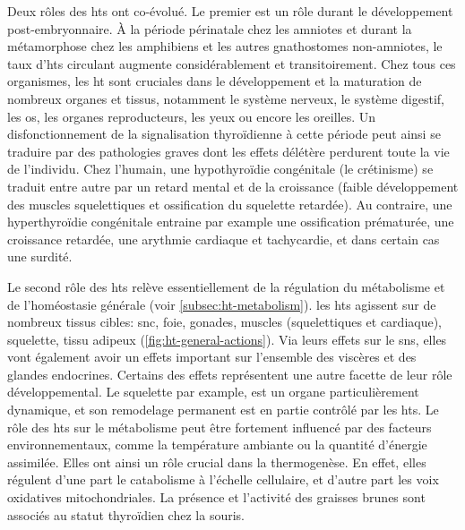 

Deux rôles des \glspl{ht} ont co-évolué.
Le premier est un rôle durant le développement post-embryonnaire.
À la période périnatale chez les amniotes et durant la métamorphose chez les amphibiens et les autres gnathostomes non-amniotes, le taux d'\glspl{ht} circulant augmente considérablement et transitoirement.
Chez tous ces organismes, les \gls{ht} sont cruciales dans le développement et la maturation de nombreux organes et tissus, notamment le système nerveux, le système digestif, les os, les organes reproducteurs, les yeux ou encore les oreilles.
Un disfonctionnement de la signalisation thyroïdienne à cette période peut ainsi se traduire par des pathologies graves dont les effets délétère perdurent toute la vie de l'individu.
Chez l'humain, une hypothyroïdie congénitale (le crétinisme) se traduit entre autre par un retard mental et de la croissance (faible développement des muscles squelettiques et ossification du squelette retardée).
Au contraire, une hyperthyroïdie congénitale entraine par example une ossification prématurée, une croissance retardée, une arythmie cardiaque et tachycardie, et dans certain cas une surdité.

Le second rôle des \glspl{ht} relève essentiellement de la régulation du métabolisme et de l'homéostasie générale (voir \autoref{subsec:ht-metabolism}).
les \glspl{ht} agissent sur de nombreux tissus cibles: \gls{snc}, foie, gonades, muscles (squelettiques et cardiaque), squelette, tissu adipeux (\autoref{fig:ht-general-actions}).
Via leurs effets sur le \gls{sns}, elles vont également avoir un effets important sur l'ensemble des viscères et des glandes endocrines.
Certains des effets représentent une autre facette de leur rôle développemental.
Le squelette par example, est un organe particulièrement dynamique, et son remodelage permanent est en partie contrôlé par les \glspl{ht}.
Le rôle des \glspl{ht} sur le métabolisme peut être fortement influencé par des facteurs environnementaux, comme la température ambiante ou la quantité d'énergie assimilée.
Elles ont ainsi un rôle crucial dans la thermogenèse.
En effet, elles régulent d'une part le catabolisme à l'échelle cellulaire, et d'autre part les voix oxidatives mitochondriales. La présence et l'activité des graisses brunes sont associés au statut thyroïdien chez la souris.

